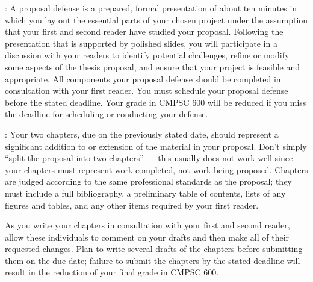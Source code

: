 \documentclass[11pt]{article}
\begin{document}
: A proposal defense is a prepared, formal presentation of about ten minutes in which you
lay out the essential parts of your chosen project under the assumption that your first and second reader have studied
your proposal.  Following the presentation that is supported by polished slides, you will participate in a discussion
with your readers to identify potential challenges, refine or modify some aspects of the thesis proposal, and ensure that
your project is feasible and appropriate. All components your proposal defense should be completed in consultation with
your first reader.  You must schedule your proposal defense before the stated deadline. Your grade in CMPSC 600 will be
reduced if you miss the deadline for scheduling or conducting your defense.

: Your two chapters, due on the previously stated date, should represent a significant
addition to or extension of the material in your proposal. Don't simply ``split the proposal into two chapters'' ---
this usually does not work well since your chapters must represent work completed, not work being proposed. Chapters are
judged according to the same professional standards as the proposal; they must include a full bibliography, a
preliminary table of contents, lists of any figures and tables, and any other items required by your first reader.

As you write your chapters in consultation with your first and second reader, allow these individuals to comment on your
drafts and then make all of their requested changes.  Plan to write several drafts of the chapters before submitting them
on the due date; failure to submit the chapters by the stated deadline will result in the reduction of your final grade
in CMPSC 600.


\end{document}
